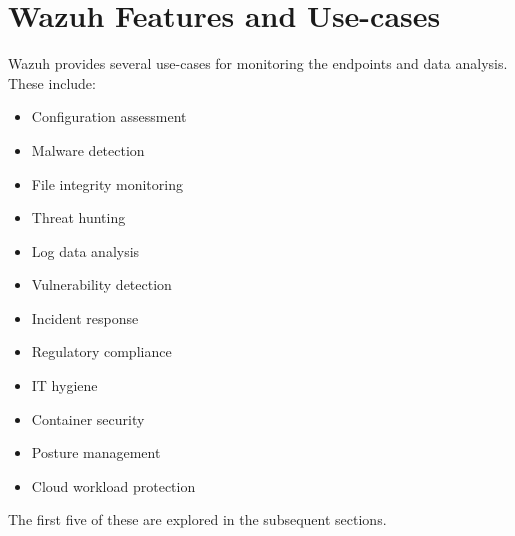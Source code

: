 \newpage
\section{Wazuh Features and Use-cases}

Wazuh provides several use-cases for monitoring the endpoints and data analysis. These include:
\begin{itemize}
    \item Configuration assessment
    \item Malware detection
    \item File integrity monitoring
    \item Threat hunting
    \item Log data analysis
    \item Vulnerability detection
    \item Incident response
    \item Regulatory compliance
    \item IT hygiene
    \item Container security
    \item Posture management
    \item Cloud workload protection
\end{itemize}

The first five of these are explored in the subsequent sections.


